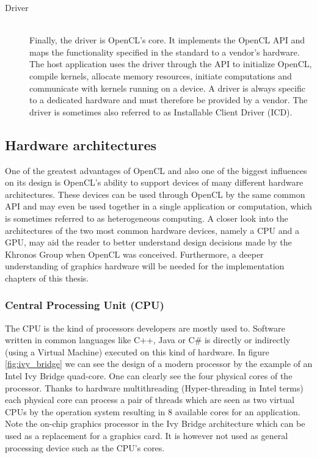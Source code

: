 \begin{description}
	\item[Driver] \hfill \\
	Finally, the driver is OpenCL's core. It implements the OpenCL API and maps the functionality specified in the standard to a vendor's hardware. The host application uses the driver through the API to initialize OpenCL, compile kernels, allocate memory resources, initiate computations and communicate with kernels running on a device. A driver is always specific to a dedicated hardware and must therefore be provided by a vendor. The driver is sometimes also referred to as Installable Client Driver (ICD).
\end{description}

\subsection{Hardware architectures}
\label{sec:hardware_arch}

One of the greatest advantages of OpenCL and also one of the biggest influences on its design is OpenCL's ability to support devices of many different hardware architectures. These devices can be used through OpenCL by the same common API and may even be used together in a single application or computation, which is sometimes referred to as heterogeneous computing.
A closer look into the architectures of the two most common hardware devices, namely a CPU and a GPU, may aid the reader to better understand design decisions made by the Khronos Group when OpenCL was conceived. Furthermore, a deeper understanding of graphics hardware will be needed for the implementation chapters of this thesis.

\subsubsection{Central Processing Unit (CPU)}

The CPU is the kind of processors developers are mostly used to. Software written in common languages like C++, Java or C\# is directly or indirectly (using a Virtual Machine) executed on this kind of hardware.
In figure \ref{fig:ivy_bridge} we can see the design of a modern processor by the example of an Intel Ivy Bridge quad-core. One can clearly see the four physical cores of the processor. Thanks to hardware multithreading (Hyper-threading in Intel terms) each physical core can process a pair of threads which are seen as two virtual CPUs by the operation system resulting in 8 available cores for an application.
Note the on-chip graphics processor in the Ivy Bridge architecture which can be used as a replacement for a graphics card. It is however not used as general processing device such as the CPU's cores.

